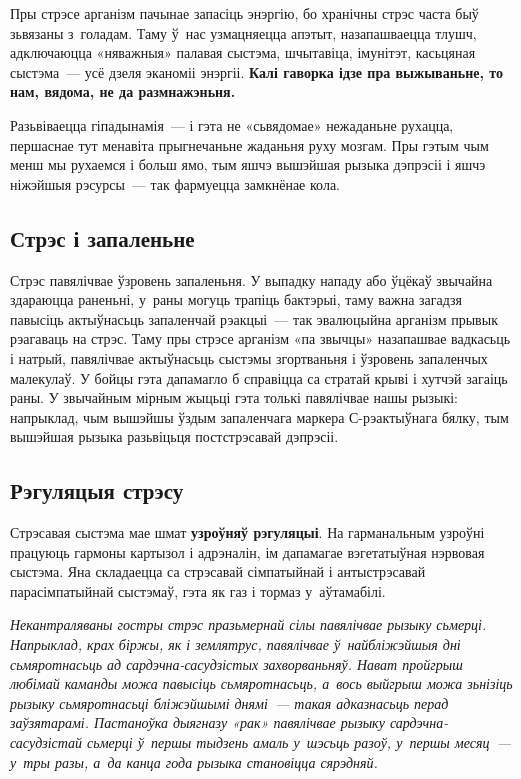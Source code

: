 Пры стрэсе арганізм пачынае запасіць энэргію, бо хранічны стрэс часта быў зьвязаны з~голадам. Таму ў~нас узмацняецца апэтыт, назапашваецца тлушч, адключаюцца «няважныя» палавая сыстэма, шчытавіца, імунітэт, касьцяная сыстэма~--- усё дзеля эканоміі энэргіі. \textbf{Калі гаворка ідзе пра выжываньне, то нам, вядома, не да размнажэньня.}

Разьвіваецца гіпадынамія~--- і гэта не «сьвядомае» нежаданьне рухацца, першаснае тут менавіта прыгнечаньне жаданьня руху мозгам. Пры гэтым чым менш мы рухаемся і больш ямо, тым яшчэ вышэйшая рызыка дэпрэсіі і яшчэ ніжэйшыя рэсурсы~--- так фармуецца замкнёнае кола.

\subsection*{Стрэс і запаленьне}

Стрэс павялічвае ўзровень запаленьня. У выпадку нападу або ўцёкаў звычайна здараюцца раненьні, у~раны могуць трапіць бактэрыі, таму важна загадзя павысіць актыўнасьць запаленчай рэакцыі~--- так эвалюцыйна арганізм прывык рэагаваць на стрэс. Таму пры стрэсе арганізм «па звычцы» назапашвае вадкасьць і натрый, павялічвае актыўнасьць сыстэмы згортваньня і ўзровень запаленчых малекулаў. У бойцы гэта дапамагло б справіцца са стратай крыві і хутчэй загаіць раны. У звычайным мірным жыцьці гэта толькі павялічвае нашы рызыкі: напрыклад, чым вышэйшы ўздым запаленчага маркера С-рэактыўнага бялку, тым вышэйшая рызыка разьвіцьця постстрэсавай дэпрэсіі.

\subsection*{Рэгуляцыя стрэсу}

Стрэсавая сыстэма мае шмат \textbf{узроўняў рэгуляцыі}. На гарманальным узроўні працуюць гармоны картызол і адрэналін, ім дапамагае вэгетатыўная нэрвовая сыстэма. Яна складаецца са стрэсавай сімпатыйнай і антыстрэсавай парасімпатыйнай сыстэмаў, гэта як газ і тормаз у~аўтамабілі. 


\emph{Некантраляваны гостры стрэс празьмернай сілы павялічвае рызыку сьмерці. Напрыклад, крах біржы, як і землятрус, павялічвае ў~найбліжэйшыя дні сьмяротнасьць ад сардэчна-сасудзістых захворваньняў. Нават пройгрыш любімай каманды можа павысіць сьмяротнасьць, а~вось выйгрыш можа зьнізіць рызыку сьмяротнасьці бліжэйшымі днямі~--- такая адказнасьць перад заўзятарамі. Пастаноўка дыягназу «рак» павялічвае рызыку сардэчна-сасудзістай сьмерці ў~першы тыдзень амаль у~шэсьць разоў, у~першы месяц~--- у~тры разы, а~да канца года рызыка становіцца сярэдняй.}

